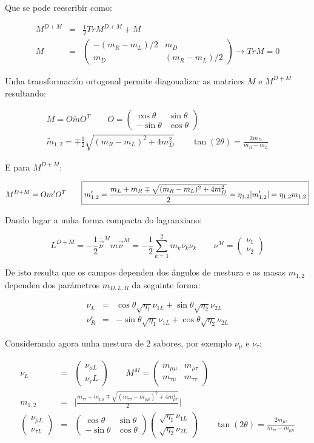 \documentclass[a4paper,10pt]{article}
\newcommand{\beq}{\begin{equation}}
\newcommand{\eeq}{\end{equation}}
\newcommand{\bea}{\begin{eqnarray}}
\newcommand{\eea}{\end{eqnarray}}
\newcommand{\bbx}{\begin{boxed}}
\newcommand{\ebx}{\end{boxed}}
\newcommand{\bmx}{\left(\begin{array}}
\newcommand{\emx}{\end{array}\right)}
\newcommand{\barra}[1]{\overline{#1}}
\newcommand{\abs}[1]{\vert #1 \vert}
\newcommand{\rvec}[1]{\overrightarrow{#1}}
\begin{document}
Que se pode reescribir como:

\bea
M^{D+M} &=& \frac{1}{2} Tr M^{D+M} + M \\
M &=& \bmx{cc} -(m_R - m_L)/2 & m_D \\ m_D & (m_R - m_L)/2 \emx \rightarrow Tr M = 0
\eea

Unha transformación ortogonal permite diagonalizar as matrices $M$ e $M^{D+M}$ resultando:

\bea
M= O \tilde m O^T \qquad O = \bmx{cc} \cos \theta & \sin \theta \\ -\sin \theta & \cos \theta \emx\\
\tilde m_{1,2} = \mp \frac{1}{2} \sqrt{(m_R - m_L)^2 + 4m_D^2} \qquad \tan (2\theta) = \frac{2 m_D}{m_R-m_L}
\eea

E para $M^{D+M}$:

\beq
M^{D+M} = O m' O^T \qquad \bbx{ m_{1,2}' = \frac{m_L + m_R \mp \sqrt{(m_R - m_L)^2 + 4m_D^2}}{2} = \eta_{1,2} \abs{m_{1,2}'} = \eta_{1,2} m_{1,2} }\ebx
\eeq

Dando lugar a unha forma compacta do lagranxiano:

\beq
L^{D+M} = -\frac{1}{2} \barra{\rvec\nu}^M m \rvec\nu^M = -\frac{1}{2} \sum_{k=1}^2 m_k \barra\nu_k \nu_k
\qquad \nu^M = \bmx{c} \nu_1 \\ \nu_2 \emx
\eeq

De isto resulta que os campos dependen dos ángulos de mestura e as masas $m_{1,2}$ dependen dos parámetros $m_{D,L,R}$ da seguinte forma:

\bea
\nu_L &=& \cos \theta \sqrt{\eta_1} \nu_{1L} + \sin \theta \sqrt{\eta_2} \nu_{2L} \\
\nu_R^c &=& - \sin \theta \sqrt{\eta_1} \nu_{1L} + \cos \theta \sqrt{\eta_2} \nu_{2L}
\eea

Considerando agora unha mestura de 2 sabores, por exemplo $\nu_\mu$ e $\nu_\tau$:

\bea
\nu_L &=& \bmx{c} \nu_{\mu L} \\ \nu{_\tau L} \emx \qquad M^M = \bmx{cc} m_{\mu\mu} & m_{\mu\tau} \\ m_{\tau\mu} & m_{\tau\tau}  \emx \nonumber \\
m_{1,2} &=& \Bigg| \frac{m_{\tau\tau} + m_{\mu\mu} \mp \sqrt{(m_{\tau\tau}-m_{\mu\mu})^2 + 4 m_{\mu\tau}^4} }{2} \Bigg| \nonumber \\
\bmx{c} \nu_{\mu L} \\ \nu_{\tau L} \emx &=& \bmx{cc} \cos \theta & \sin \theta \\ -\sin \theta & \cos \theta \emx \bmx{c} \sqrt{\eta_1} \nu_{1L} \\ \sqrt{\eta_2} \nu_{2L} \emx \qquad \tan (2\theta) = \frac{ 2 m_{\mu\tau}}{m_{\tau\tau} - m_{\mu\mu}} \nonumber
\eea
\end{document}
